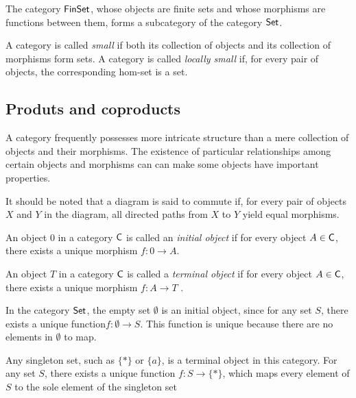 \begin{example}
  The category $\mathsf{FinSet}$, whose objects are finite sets and whose morphisms are functions between them, forms a subcategory of the category $\mathsf{Set}$.
\end{example}


\begin{definition}
  A category is called \emph{small} if both its collection of objects and its collection of morphisms form sets.
A category is called \emph{locally small} if, for every pair of objects, the corresponding hom-set is a set.
\end{definition}






\subsection{Produts and coproducts}

 A category frequently possesses more intricate structure than a mere collection of objects and their morphisms. The existence of particular relationships among certain objects and morphisms can can make some objects have important properties.

It should be noted that a diagram is said to commute if, for every pair of objects $X$ and $Y$ in the diagram, all directed paths from 
$X$ to $Y$ yield equal morphisms.

\begin{definition}
  An object \( 0 \) in a category \( \mathsf{C} \) is called an \emph{initial object} if for every object \( A \in \mathsf{C}  \), there exists a unique morphism  $f: 0 \to A $.

\end{definition}

\begin{definition}
  An object \( T \) in a category \( \mathsf{C}  \) is called a \emph{terminal object} if for every object \( A \in \mathsf{C}  \), there exists a unique morphism $ f: A \to T $ .
\end{definition}

\begin{example}
In the category \( \mathsf{Set} \), the empty set \( \emptyset \) is an initial object, since for any set \( S \), there exists a unique function$f : \emptyset \to S.$
This function is unique because there are no elements in \( \emptyset \) to map.

Any singleton set, such as \( \{*\} \) or \( \{a\} \), is a terminal object in this category. For any set \( S \), there exists a unique function $f : S \to \{*\}$,
which maps every element of \( S \) to the sole element of the singleton set
\end{example}

